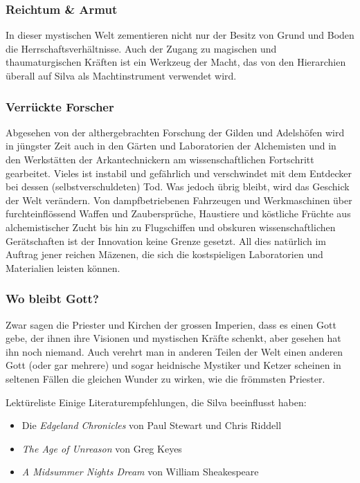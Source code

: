\documentclass[12pt,twoside,twocolumn,openany]{book}
\begin{document}
\subsubsection{Reichtum \& Armut}
In dieser mystischen Welt zementieren nicht nur der Besitz von Grund und Boden die Herrschaftsverhältnisse. Auch der Zugang zu magischen und thaumaturgischen Kräften ist ein Werkzeug der Macht, das von den Hierarchien überall auf Silva als Machtinstrument verwendet wird.


\subsubsection{Verrückte Forscher}
Abgesehen von der althergebrachten Forschung der Gilden und Adelshöfen wird in jüngster Zeit auch in den Gärten und Laboratorien der Alchemisten und in den Werkstätten der Arkantechnickern am wissenschaftlichen Fortschritt gearbeitet. Vieles ist instabil und gefährlich und verschwindet mit dem Entdecker bei dessen (selbstverschuldeten) Tod. Was jedoch übrig bleibt, wird das Geschick der Welt verändern. Von dampfbetriebenen Fahrzeugen und Werkmaschinen über furchteinflössend Waffen und Zaubersprüche, Haustiere und köstliche Früchte aus alchemistischer Zucht bis hin zu Flugschiffen und obskuren wissenschaftlichen Gerätschaften ist der Innovation keine Grenze gesetzt. All dies natürlich im Auftrag jener reichen Mäzenen, die sich die kostspieligen Laboratorien und Materialien leisten können.

\subsubsection{Wo bleibt Gott?}
Zwar sagen die Priester und Kirchen der grossen Imperien, dass es einen Gott gebe, der ihnen ihre Visionen und mystischen Kräfte schenkt, aber gesehen hat ihn noch niemand. Auch verehrt man in anderen Teilen der Welt einen anderen Gott (oder gar mehrere) und sogar heidnische Mystiker und Ketzer scheinen in seltenen Fällen die gleichen Wunder zu wirken, wie die frömmsten Priester.

\begin{table}[h]
	\begin{commentbox}{Lektüreliste}
		Einige Literaturempfehlungen, die Silva beeinflusst haben:
		\begin{itemize}
			\item Die \emph{Edgeland Chronicles} von Paul Stewart und Chris Riddell
			\item \emph{The Age of Unreason} von Greg Keyes
			\item \emph{A Midsummer Nights Dream} von William Sheakespeare
		\end{itemize}
	\end{commentbox}
\end{table}
\end{document}
